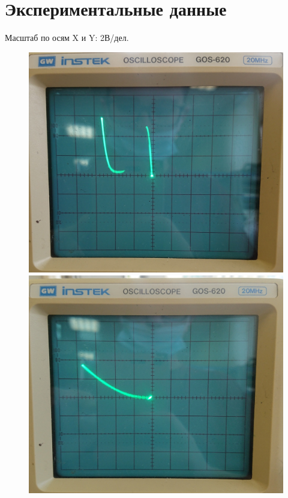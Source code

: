 \documentclass[a4paper,12pt]{article} %
\begin{document}
	\section{Экспериментальные данные}
	Масштаб по осям X и Y: 2В/дел.
	\begin{figure}[h!]
		\begin{floatrow}
			{\includegraphics[scale=0.18]{osc1}}
			{\includegraphics[scale=0.18]{osc2}}     
		\end{floatrow}
	\end{figure}
	
\end{document}
